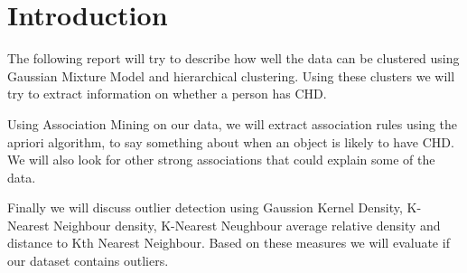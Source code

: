 \section{Introduction}
The following report will try to describe how well the data can be clustered using Gaussian Mixture Model and hierarchical clustering. Using these clusters we will try to extract information on whether a person has CHD.

Using Association Mining on our data, we will extract association rules using the apriori algorithm, to say something about when an object is likely to have CHD. We will also look for other strong associations that could explain some of the data.

Finally we will discuss outlier detection using Gaussion Kernel Density, K-Nearest Neighbour density, K-Nearest Neughbour average relative density and distance to Kth Nearest Neighbour. Based on these measures we will evaluate if our dataset contains outliers.


